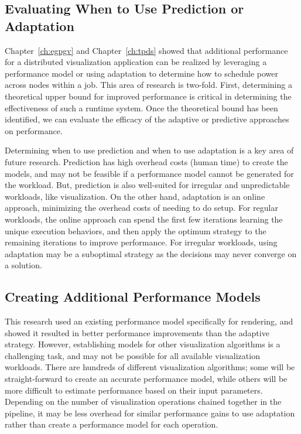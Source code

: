 \subsection{Evaluating When to Use Prediction or Adaptation}

Chapter~\ref{ch:egpgv} and Chapter~\ref{ch:tpds} showed that additional performance
for a distributed visualization application can be realized by leveraging a
performance model or using adaptation to determine how to schedule power across
nodes within a job.
%
This area of research is two-fold.
%
First, determining a theoretical upper bound for improved performance is
critical in determining the effectiveness of such a runtime system.
%
Once the theoretical bound has been identified, we can evaluate the efficacy of
the adaptive or predictive approaches on performance.

Determining when to use prediction and when to use adaptation is a key area of
future research.
%
Prediction has high overhead costs (\ie human time) to create the models, and
may not be feasible if a performance model cannot be generated for the
workload.
%
But, prediction is also well-suited for irregular and unpredictable workloads,
like visualization.
%
On the other hand, adaptation is an online approach, minimizing the overhead
costs of needing to do setup.
%
For regular workloads, the online approach can spend the first few iterations
learning the unique execution behaviors, and then apply the optimum strategy to
the remaining iterations to improve performance.
%
For irregular workloads, using adaptation may be a suboptimal strategy as the
decisions may never converge on a solution.

\subsection{Creating Additional Performance Models}
This research used an existing performance model specifically for rendering,
and showed it resulted in better performance improvements than the adaptive
strategy.
%
However, establishing models for other visualization algorithms is a
challenging task, and may not be possible for all available visualization
workloads.
%
There are hundreds of different visualization algorithms; some will be
straight-forward to create an accurate performance model, while others will be
more difficult to estimate performance based on their input parameters.
%
Depending on the number of visualization operations chained together in the
pipeline, it may be less overhead for similar performance gains to use
adaptation rather than create a performance model for each operation.

